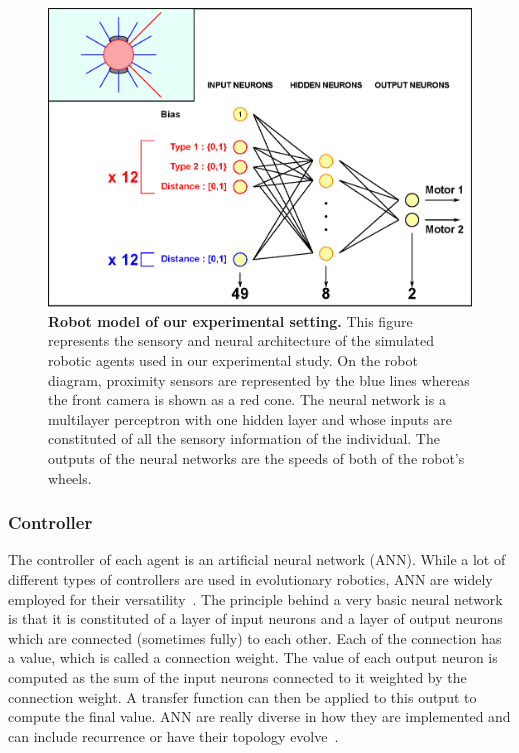         \begin{figure}[hbt]
            \begin{center}
              \includegraphics[scale = 0.60]{fig/Intro/RobotModel.eps}
              \caption{\textbf{Robot model of our experimental setting.}
              This figure represents the sensory and neural architecture of the simulated robotic agents used in our experimental study. On the robot diagram, proximity sensors are represented by the blue lines whereas the front camera is shown as a red cone. The neural network is a multilayer perceptron with one hidden layer and whose inputs are constituted of all the sensory information of the individual. The outputs of the neural networks are the speeds of both of the robot's wheels.} 
              \label{fig:RobotModel}
            \end{center}
        \end{figure}

    \subsubsection{Controller} 

        The controller of each agent is an artificial neural network (ANN). While a lot of different types of controllers are used in evolutionary robotics, ANN are widely employed for their versatility~\parencite{Doncieux2015a}. The principle behind a very basic neural network is that it is constituted of a layer of input neurons and a layer of output neurons which are connected (sometimes fully) to each other. Each of the connection has a value, which is called a connection weight. The value of each output neuron is computed as the sum of the input neurons connected to it weighted by the connection weight. A transfer function can then be applied to this output to compute the final value. ANN are really diverse in how they are implemented and can include recurrence or have their topology evolve~\parencite{Stanley2002}.

